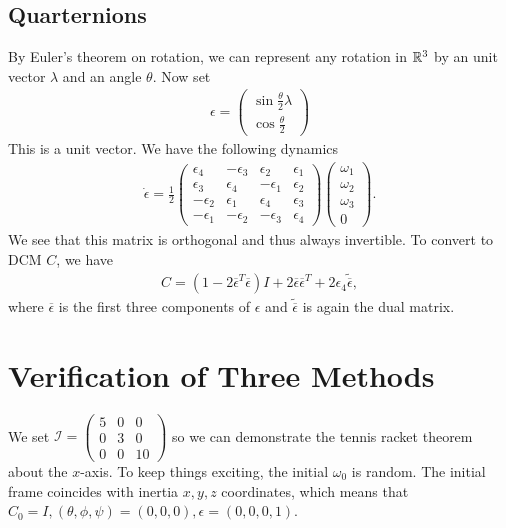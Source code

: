 \documentclass[12pt]{article}
\begin{document}
\subsection{Quarternions}
By Euler's theorem on rotation, we can represent any rotation in $ \mathbb{R}^3$ by an unit vector $ \lambda$ and an angle $ \theta$. Now set
\begin{align*}
	\epsilon = \begin{pmatrix} \sin \frac{\theta}{2} \lambda \\ \cos \frac{\theta}{2} \end{pmatrix} 
\end{align*}
This is a unit vector. We have the following dynamics
\begin{align*}
	\dot{ \epsilon} = \frac{1}{2} \begin{pmatrix} \epsilon_4&- \epsilon_3& \epsilon_2& \epsilon_1 \\ \epsilon_3& \epsilon_4& - \epsilon_1 & \epsilon_2\\ - \epsilon_2 & \epsilon_1 & \epsilon_4 & \epsilon_3\\ - \epsilon_1& - \epsilon_2 & - \epsilon_3 & \epsilon_4 \end{pmatrix}  \begin{pmatrix} \omega_1\\ \omega_2 \\ \omega_3 \\0 \end{pmatrix} .
\end{align*}
We see that this matrix is orthogonal and thus always invertible. To convert to DCM $ C$, we have
 \begin{align*}
	C = (1- 2 \overline{ \epsilon}^{T} \overline{ \epsilon}) I + 2 \overline{ \epsilon} \overline{ \epsilon}^{T} + 2 \epsilon_4 \widetilde{ \overline{ \epsilon}},
\end{align*}
where $ \overline{ \epsilon}$ is the first three components of $ \epsilon$ and $ \widetilde{ \overline{ \epsilon}}$ is again the dual matrix.

\section{Verification of Three Methods}
We set $ \mathcal{ I} = \begin{pmatrix} 5&0&0\\0&3&0\\0&0&10 \end{pmatrix} $ so we can demonstrate the tennis racket theorem about the $ x$-axis. To keep things exciting, the initial $ \omega_0$ is random. The initial frame coincides with inertia $ x,y,z$ coordinates, which means that  $C_0 = I, (\theta,\phi,\psi) = (0,0,0),  \epsilon = (0,0,0,1)$.
\end{document}
